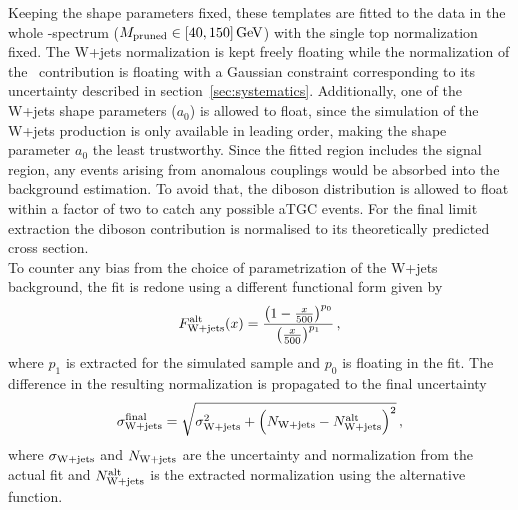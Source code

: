 \noindent Keeping the shape parameters fixed, these templates are fitted to the data in the whole \Mpr -spectrum ($M_\mathrm{pruned} \in [40,150]\,{\rm GeV}$) with the single top normalization fixed. The W+jets normalization is kept freely floating while the normalization of the \ttbar \ contribution is floating with a Gaussian constraint corresponding to its uncertainty described in section~\ref{sec:systematics}. Additionally, one of the W+jets shape parameters ($a_0$) is allowed to float, since the simulation of the W+jets production is only available in leading order, making the shape parameter $a_0$ the least trustworthy. Since the fitted region includes the signal region, any events arising from anomalous couplings would be absorbed into the background estimation. To avoid that, the diboson distribution is allowed to float within a factor of two to catch any possible aTGC events. For the final limit extraction the diboson contribution is normalised to its theoretically predicted cross section.\\

\noindent To counter any bias from the choice of parametrization of the W+jets background, the fit is redone using a different functional form given by
\begin{equation}
F_{\rm W+jets}^{\rm alt}(x)=\frac{\left(1-\frac{x}{500}\right)^{p_0}}{\left(\frac{x}{500}\right)^{p_1}} \, ,
\end{equation}
where $p_1$ is extracted for the simulated sample and $p_0$ is floating in the fit. The difference in the resulting normalization is propagated to the final uncertainty
\begin{equation}
\sigma_{\rm W+jets}^{\rm final} = \sqrt{\sigma_{\rm W+jets}^2 + \left(N_{\rm W+jets} - N_{\rm W+jets}^{\rm alt}\right)^2} \, ,
\label{eq:bkg:wjetsunc}
\end{equation}
where $\sigma_{\rm W+jets}$ and $N_{\rm W+jets}$ are the uncertainty and normalization from the actual fit and $N_{\rm W+jets}^{\rm alt}$ is the extracted normalization using the alternative function. \\

